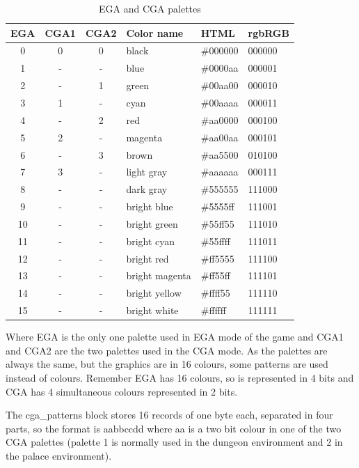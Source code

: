 \documentclass{article}
\begin{document}
\begin{table}

\begin{tabular}{ccclll}
\hline
  EGA & CGA1 & CGA2  & Color name      &  HTML     & rgbRGB \\
\hline
  0   & 0    & 0     & black           & \#000000  & 000000 \\
  1   & -    & -     & blue            & \#0000aa  & 000001 \\
  2   & -    & 1     & green           & \#00aa00  & 000010 \\
  3   & 1    & -     & cyan            & \#00aaaa  & 000011 \\
  4   & -    & 2     & red             & \#aa0000  & 000100 \\
  5   & 2    & -     & magenta         & \#aa00aa  & 000101 \\
  6   & -    & 3     & brown           & \#aa5500  & 010100 \\
  7   & 3    & -     & light gray      & \#aaaaaa  & 000111 \\
  8   & -    & -     & dark gray       & \#555555  & 111000 \\
  9   & -    & -     & bright blue     & \#5555ff  & 111001 \\
  10  & -    & -     & bright green    & \#55ff55  & 111010 \\
  11  & -    & -     & bright cyan     & \#55ffff  & 111011 \\
  12  & -    & -     & bright red      & \#ff5555  & 111100 \\
  13  & -    & -     & bright magenta  & \#ff55ff  & 111101 \\
  14  & -    & -     & bright yellow   & \#ffff55  & 111110 \\
  15  & -    & -     & bright white    & \#ffffff  & 111111 \\
\hline
\end{tabular}
\caption{EGA and CGA palettes}
\end{table}


 Where  EGA is the only one palette used in EGA mode of the game and CGA1
 and CGA2 are the two palettes used in the  CGA mode.
 As the palettes are always the same, but the graphics are in 16 colours,
 some patterns are used instead of colours.
 Remember EGA has 16 colours, so is represented in 4 bits and CGA has 4
 simultaneous colours represented in 2 bits.

 The cga\_patterns block stores 16 records of one byte each, separated in
 four parts, so the format is aabbccdd where aa is a two bit colour in one
 of the two CGA palettes (palette 1 is normally used in the  dungeon
 environment and 2 in the palace environment).
 
\end{document}
